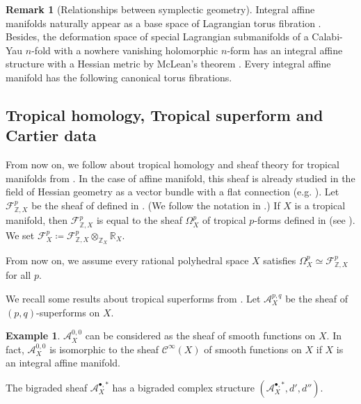 \documentclass[a4paper,dvipdfmx,reqno,12pt]{amsart}
\theoremstyle{definition}
\newtheorem{example}[theorem]{Example}
\newtheorem{remark}[theorem]{Remark}
\newcommand{\deq}{\coloneqq}
\numberwithin{equation}{section}
\begin{document}
\begin{remark}[{Relationships between symplectic geometry}]
Integral affine manifolds naturally appear 
as a base space of Lagrangian torus fibration 
\cite{duistermaatGlobalActionangleCoordinates1980a}. 
Besides, the deformation space of 
special Lagrangian submanifolds of
a Calabi-Yau $n$-fold with a nowhere vanishing 
holomorphic $n$-form has 
an integral affine structure with 
a Hessian metric by McLean's theorem \cite{MR1664890}.
Every integral affine manifold has 
the following canonical torus fibrations.
\end{remark}







\subsection{Tropical homology, Tropical superform and Cartier data}
From now on, we follow about tropical homology and sheaf 
theory for tropical manifolds
from \cite{mikhalkinTropicalEigenwaveIntermediate2014a,
MR3903579,gross2019sheaftheoretic}.
In the case of affine manifold, this sheaf is already
studied in the field of Hessian geometry as a vector bundle
with a flat connection
(e.g. \cite[Chapter 7]{MR2293045}).
Let $\mathcal{F}^{p}_{\mathbb{Z},X}$ be 
the sheaf of  defined in 
\cite[2.4]{mikhalkinTropicalEigenwaveIntermediate2014a}.
 (We follow the notation in \cite[Definition 2.4]{MR3894860}.)
If $X$ is a tropical manifold, then 
$\mathcal{F}^{p}_{\mathbb{Z},X}$ is equal 
to the sheaf $\Omega_{X}^{p}$ of tropical $p$-forms defined 
in \cite[Definition 2.7]{gross2019sheaftheoretic}
(see \cite[Remark 2.8]{gross2019sheaftheoretic}).
We set $\mathcal{F}^{p}_{X}\deq 
\mathcal{F}^{p}_{\mathbb{Z}, X}
\otimes_{\mathbb{Z}_X}\mathbb{R}_X$.

From now on, we assume every rational polyhedral space $X$
satisfies $\Omega_X^{p}\simeq \mathcal{F}_{\mathbb{Z},X}^{p}$
for all $p$. 

We recall some results about tropical superforms from
\cite{MR3903579,smacka2017differential}.
Let $\mathcal{A}^{p,q}_X$ be the sheaf of 
$(p,q)$-superforms on $X$. 
\begin{example}
$\mathcal{A}_X^{0,0}$ can be considered as the 
sheaf of smooth functions on $X$.
In fact, $\mathcal{A}_X^{0,0}$ is isomorphic to 
the sheaf $\mathcal{C}^{\infty}(X)$ of smooth functions 
on $X$ if $X$ is an integral affine manifold.
\end{example}
The bigraded sheaf $\mathcal{A}_X^{\bullet,*}$ has a bigraded
complex structure
$(\mathcal{A}_X^{\bullet,*},d',d'')$.
\end{document}
